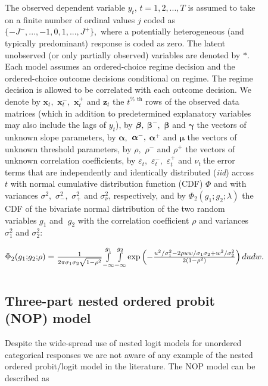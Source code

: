 \documentclass[letterpaper,fleqn,12pt]{article}
\begin{document}
\begin{figure}[H]
\begin{onehalfspace}
The observed dependent variable $y_{t}$, $t=1,2,...,T$ is assumed to take on
a finite number of ordinal values $j$ coded as $%
\{-J^{-},...,-1,0,1,...,J^{+}\},$ where a potentially heterogeneous (and
typically predominant) response is coded as zero. The latent unobserved (or
only partially observed) variables are denoted by $\ast $. Each model
assumes an ordered-choice regime decision and the ordered-choice outcome
decisions conditional on regime. The regime decision is allowed to be
correlated with each outcome decision. We denote by $\mathbf{x}_{t},$ $%
\mathbf{x}_{t}^{-},$ $\mathbf{x}_{t}^{+}$ and $\mathbf{z}_{t}$ the $t^{\text{%
th}}$ rows of the observed data matrices (which in addition to predetermined
explanatory variables may also include the lags of $y_{t}$), by $\mathbf{%
\beta ,}$ $\mathbf{\beta }^{-},$ $\mathbf{\beta }$ and $\mathbf{\gamma }$
the vectors of unknown slope parameters, by $\mathbf{\alpha ,}$ $\mathbf{%
\alpha }^{-}\mathbf{,}$ $\mathbf{\alpha }^{+}$ and $\mathbf{\mu }$ the
vectors of unknown threshold parameters, by $\rho ,$ $\rho ^{-}$ and $\rho
^{+}$ the vectors of unknown correlation coefficients, by $\varepsilon _{t},$
$\varepsilon _{t}^{-},$ $\varepsilon _{t}^{+}$ and $\nu _{t}\ $the error
terms that are independently and identically distributed (\textit{iid})
across $t$ with normal cumulative distribution function (CDF) $\Phi $ and
with variances $\sigma ^{2},$ $\sigma _{-}^{2},$ $\sigma _{+}^{2}$ and $%
\sigma _{\nu }^{2}$, respectively, and by $\Phi _{2}(g_{1}\mathbf{;}g_{2}%
\mathbf{;}\lambda )$ the CDF of the bivariate normal distribution of the two
random variables $g_{1}$ and\textbf{\ }$g_{2}$ with the correlation
coefficient $\rho $ and variances $\sigma _{1}^{2}$ and $\sigma _{2}^{2}$:

\begin{center}
$\Phi _{2}(g_{1}\mathbf{;}g_{2}\mathbf{;}\rho )=\frac{1}{2\pi \sigma
_{1}\sigma _{2}\sqrt{1-\rho ^{2}}}\underset{}{\underset{-\infty }{\overset{%
g_{1}}{\int }}}\underset{-\infty }{\overset{g_{2}}{\int }}\exp \left( -\frac{%
u^{2}/\sigma _{1}^{2}-2\rho uw/\sigma _{1}\sigma _{2}+w^{2}/\sigma _{2}^{2}}{%
2(1-\rho ^{2})}\right) dudw.$
\end{center}

\subsection{Three-part nested ordered probit (NOP) model}

Despite the wide-spread use of nested logit models for unordered categorical
responses we are not aware of any example of the nested ordered probit/logit
model in the literature. The NOP model can be described as


\end{onehalfspace}
\end{figure}
\end{document}
